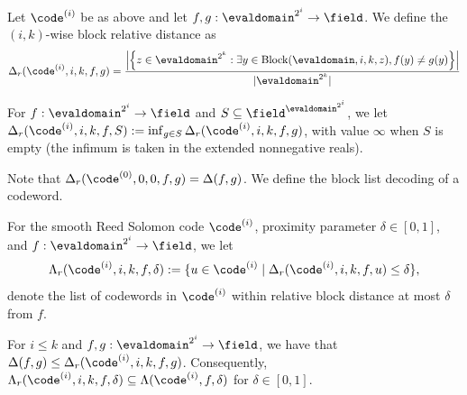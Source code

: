 \begin{definition}\label{def:block_rel_distance}
\leanok
{}
    Let $\code^{(i)}$ be as above and let $f, g : \evaldomain^{2^i} \to \field$. We define the $(i,k)$-wise block relative distance as
    \[
    \Delta_{r}(\code^{(i)}, i, k, f, g) = \frac{ \left| \left\{ z \in \evaldomain^{2^k} : \exists y \in \mathrm{Block}(\evaldomain, i, k, z), f(y) \neq g(y) \right\} \right| }{ |\evaldomain^{2^k}| }
    \]
\end{definition}

\begin{definition}\label{def:min_block_rel_distance}
\leanok
{}
    For $f : \evaldomain^{2^i} \to \field$ and $S \subseteq \field^{\evaldomain^{2^i}}$, we let $\Delta_{r}(\code^{(i)}, i, k, f, S) := \inf_{g \in S} \Delta_{r}(\code^{(i)}, i, k, f, g)$, with value $\infty$ when $S$ is empty (the infimum is taken in the extended nonnegative reals).
\end{definition}

{Note that $\Delta_{r}(\code^{(0)}, 0, 0, f, g) = \Delta(f, g)$. We define the block list decoding of a codeword.}

\begin{definition}\label{def:list_close_codewords_block}
\leanok
{}
    For the smooth Reed Solomon code $\code^{(i)}$, proximity parameter $\delta \in [0,1]$, and $f : \evaldomain^{2^i} \to \field$, we let
    \[
    \Lambda_{r}(\code^{(i)}, i, k, f, \delta) := \{ u \in \code^{(i)} \mid \Delta_{r}(\code^{(i)}, i, k, f, u) \leq \delta \},
    \]
    denote the list of codewords in $\code^{(i)}$ within relative block distance at most $\delta$ from $f$.
\end{definition}

\begin{lemma}\label{lemma:block_rel_distance}
\leanok
{}
    For $i\le k$ and $f, g : \evaldomain^{2^i} \to \field$, we have that $\Delta(f, g) \leq \Delta_{r}(\code^{(i)}, i, k, f, g)$. Consequently, $\Lambda_{r}(\code^{(i)}, i, k, f, \delta) \subseteq \Lambda(\code^{(i)}, f, \delta)$ for $\delta\in[0,1]$.
\end{lemma}

